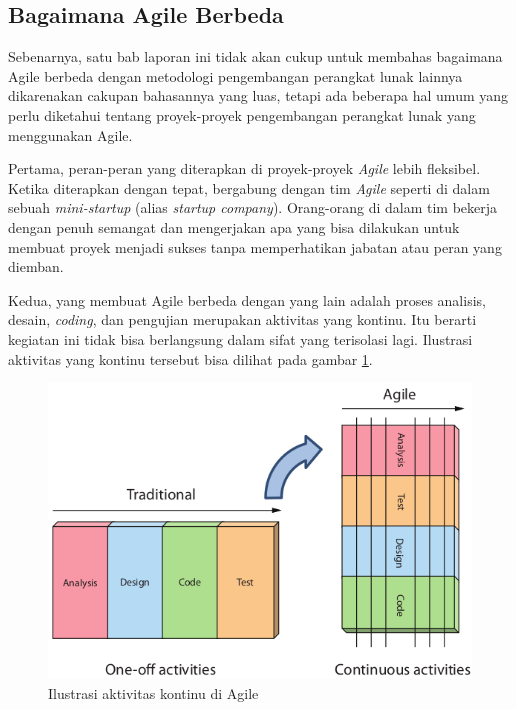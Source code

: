 \documentclass[a4paper, 12pt]{report}
\begin{document}
\subsection{Bagaimana Agile Berbeda}
\onehalfspacing Sebenarnya, satu bab laporan ini tidak akan cukup untuk membahas bagaimana Agile berbeda dengan metodologi pengembangan perangkat lunak lainnya dikarenakan cakupan bahasannya yang luas, tetapi ada beberapa hal umum yang perlu diketahui tentang proyek-proyek pengembangan perangkat lunak yang menggunakan Agile.

\onehalfspacing Pertama, peran-peran yang diterapkan di proyek-proyek \textit{Agile} lebih fleksibel. Ketika diterapkan dengan tepat, bergabung dengan tim \textit{Agile} seperti di dalam sebuah \textit{mini-startup} (alias \textit{startup company}). Orang-orang di dalam tim bekerja dengan penuh semangat dan mengerjakan apa yang bisa dilakukan untuk membuat proyek menjadi sukses tanpa memperhatikan jabatan atau peran yang diemban.

\newpage
\onehalfspacing Kedua, yang membuat Agile berbeda dengan yang lain adalah proses analisis, desain, \textit{coding}, dan pengujian merupakan aktivitas yang kontinu. Itu berarti kegiatan ini tidak bisa berlangsung dalam sifat yang terisolasi lagi. Ilustrasi aktivitas yang kontinu tersebut bisa dilihat pada gambar \ref{agile-process}.

\begin{figure}[htp]
\centering
\includegraphics[scale=0.60]{images/agile-process.png}
\caption{Ilustrasi aktivitas kontinu di Agile \cite{agile-samurai}}
\label{agile-process}
\end{figure}
\end{document}
